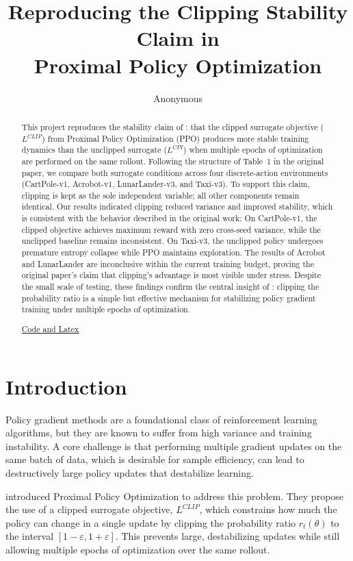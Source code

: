 \documentclass{article}
\title{Reproducing the Clipping Stability Claim in\\Proximal Policy Optimization}
\author{Anonymous}
\begin{document}
\maketitle

\begin{abstract}
This project reproduces the stability claim of \citep{schulman2017ppo}: that the clipped surrogate objective ($L^{CLIP}$) from Proximal Policy Optimization (PPO) produces more stable training dynamics than the unclipped surrogate ($L^{CPI}$) when multiple epochs of optimization are performed on the same rollout. Following the structure of Table~1 in the original paper, we compare both surrogate conditions across four discrete-action environments (CartPole-v1, Acrobot-v1, LunarLander-v3, and Taxi-v3). To support this claim, clipping is kept as the sole independent variable; all other components remain identical. Our results indicated clipping reduced variance and improved stability, which is consistent with the behavior described in the original work: On CartPole-v1, the clipped objective achieves maximum reward with zero cross-seed variance, while the unclipped baseline remains inconsistent. On Taxi-v3, the unclipped policy undergoes premature entropy collapse while PPO maintains exploration. The results of Acrobot and LunarLander are inconclusive within the current training budget, proving the original paper's claim that clipping's advantage is most visible under stress. Despite the small scale of testing, these findings confirm the central insight of \citep{schulman2017ppo}: clipping the probability ratio is a simple but effective mechanism for stabilizing policy gradient training under multiple epochs of optimization.

\href{https://github.com/morderbet/ECE570-Project-PPO-Reproduction}{Code and Latex}
\end{abstract}

\section{Introduction}

Policy gradient methods are a foundational class of reinforcement learning algorithms, but they are known to suffer from high variance and training instability. A core challenge is that performing multiple gradient updates on the same batch of data, which is desirable for sample efficiency, can lead to destructively large policy updates that destabilize learning.

\citet{schulman2017ppo} introduced Proximal Policy Optimization to address this problem. They propose the use of a clipped surrogate objective, $L^{CLIP}$, which constrains how much the policy can change in a single update by clipping the probability ratio $r_t(\theta)$ to the interval $[1-\varepsilon, 1+\varepsilon]$. This prevents large, destabilizing updates while still allowing multiple epochs of optimization over the same rollout.
\end{document}
